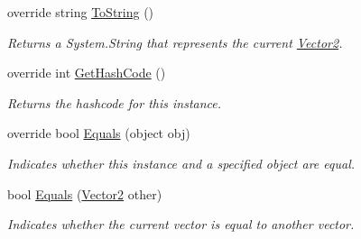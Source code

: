 \begin{DoxyCompactItemize}
override string \hyperlink{struct_open_t_k_1_1_vector2_a1c656be132bc296d4c25e1e951b09792}{To\-String} ()
\begin{DoxyCompactList}\small\item\em Returns a System.\-String that represents the current \hyperlink{struct_open_t_k_1_1_vector2}{Vector2}. \end{DoxyCompactList}\item 
override int \hyperlink{struct_open_t_k_1_1_vector2_acbfa30b79a59fc1204213acbc7ae41b8}{Get\-Hash\-Code} ()
\begin{DoxyCompactList}\small\item\em Returns the hashcode for this instance. \end{DoxyCompactList}\item 
override bool \hyperlink{struct_open_t_k_1_1_vector2_a51249d5ec60cf5420ef3d3e5d85fe4c5}{Equals} (object obj)
\begin{DoxyCompactList}\small\item\em Indicates whether this instance and a specified object are equal. \end{DoxyCompactList}\item 
bool \hyperlink{struct_open_t_k_1_1_vector2_ab092658ecf87e2e0da0c69b17c6d9012}{Equals} (\hyperlink{struct_open_t_k_1_1_vector2}{Vector2} other)
\begin{DoxyCompactList}\small\item\em Indicates whether the current vector is equal to another vector.\end{DoxyCompactList}\end{DoxyCompactItemize}
